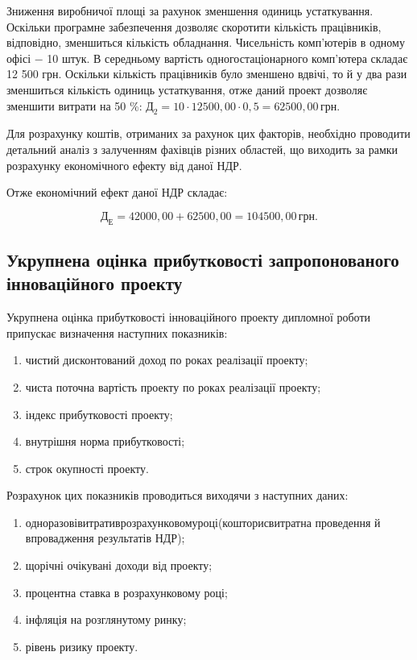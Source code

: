 Зниження виробничої площі за рахунок зменшення одиниць устаткування. Оскільки програмне забезпечення дозволяє скоротити кількість працівників, відповідно, зменшиться кількість обладнання. Чисельність комп’ютерів в одному офісі $-$ 10 штук. В середньому вартість одногостаціонарного комп’ютера складає 12 500 грн. Оскільки кількість працівників було зменшено вдвічі, то й у два рази зменшиться кількість одиниць устаткування, отже даний проект дозволяє зменшити витрати на 50 \%: $\text{Д}_{2} = 10 \cdot 12500,00 \cdot 0,5 = 62500,00 \, \text{грн}$.

Для розрахунку коштів, отриманих за рахунок цих факторів, необхідно проводити детальний аналіз з залученням фахівців різних областей, що виходить за рамки розрахунку економічного ефекту від даної НДР.

Отже економічний ефект даної НДР складає:

\[
	\text{Д}_{\text{Е}} = 42000,00 + 62500,00 = 104500,00 \, \text{грн}.
\]

\vspace{1.5em}

\subsection{Укрупнена оцінка прибутковості запропонованого інноваційного проекту}

Укрупнена оцінка прибутковості інноваційного проекту дипломної роботи припускає визначення наступних показників:

\begin{enumerate}
	\item чистий дисконтований доход по роках реалізації проекту;
	\item чиста поточна вартість проекту по роках реалізації проекту;
	\item індекс прибутковості проекту;
	\item внутрішня норма прибутковості;
	\item строк окупності проекту.
\end{enumerate}

Розрахунок цих показників проводиться виходячи з наступних даних:

\begin{enumerate}
	\item одноразові\hfill витрати\hfill в\hfill розрахунковому\hfill році\hfill (кошторис\hfill витрат\hfill на\newline \hspace*{-20mm} проведення й впровадження результатів НДР);
	\item щорічні очікувані доходи від проекту;
	\item процентна ставка в розрахунковому році;
	\item інфляція на розглянутому ринку;
	\item рівень ризику проекту.
\end{enumerate}

